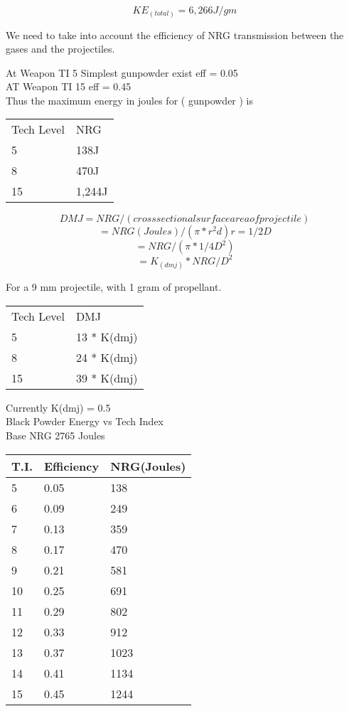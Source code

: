\[KE_{(total)} = 6,266J/gm\]

We need to take into account the efficiency of NRG transmission 
between the gases and the projectiles. 

At Weapon TI 5 Simplest gunpowder exist	eff = 0.05 \\

AT Weapon TI 15 eff = 0.45 \\

Thus the maximum energy in joules for ( gunpowder ) is  

\begin{tabular}{||l|l||} \hline
Tech Level  & NRG \\
	5 	    & 138J \\
	8	    & 470J \\
	15  	& 1,244J  \\ \hline 
\end{tabular}
                 
\[DMJ 	= NRG/(cross sectional surface area of projectile)\]
\[= NRG(Joules)/(\pi * r^{2}d)  r = 1/2 D \]
\[= NRG/(\pi * 1/4 D^{2}) \]
\[= K_{(dmj)} * NRG/D^{2} \]

For a 9 mm projectile, with 1 gram of propellant.

\begin{tabular}{||l|l||} \hline 
Tech Level  & DMJ \\
	5		& 13 * K(dmj) \\
	8		& 24 * K(dmj) \\
	15		& 39 * K(dmj) \\ \hline 
\end{tabular}

Currently K(dmj) = 0.5 \\
Black Powder Energy vs Tech Index \\
Base NRG     2765 Joules \\

\begin{tabular}{||l|l|l||} \hline 
T.I.   &  Efficiency    &    NRG(Joules) \\ \hline 
5	   &	0.05        &    138 \\
6		& 0.09          &    249 \\
7		& 0.13          &    359 \\
8		& 0.17          &    470 \\
9      	& 0.21          &    581 \\
10     	& 0.25          &    691 \\
11     	& 0.29          &    802 \\
12     	& 0.33          &    912 \\
13     	& 0.37          &    1023 \\
14     	& 0.41          &    1134 \\
15     	& 0.45          &    1244 \\ \hline 
\end{tabular}

